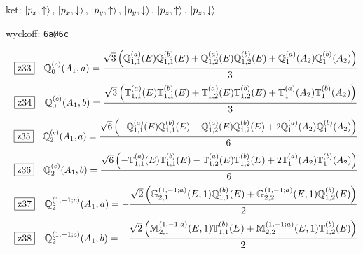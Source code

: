 \documentclass[fleqn,10pt,landscape]{jsarticle}
\begin{document}
\noindent\quad * ket: $\ket{p_{x},\uparrow},\, \ket{p_{x},\downarrow},\, \ket{p_{y},\uparrow},\, \ket{p_{y},\downarrow},\, \ket{p_{z},\uparrow},\, \ket{p_{z},\downarrow}$

\noindent\quad * wyckoff: \texttt{6a@6c}

\begin{dmath*}
\hspace*{3mm}\fbox{z33}\quad \mathbb{Q}_{0}^{(c)}(A_{1},a)=\frac{\sqrt{3} \left(\mathbb{Q}_{1,1}^{(a)}(E) \mathbb{Q}_{1,1}^{(b)}(E) + \mathbb{Q}_{1,2}^{(a)}(E) \mathbb{Q}_{1,2}^{(b)}(E) + \mathbb{Q}_{1}^{(a)}(A_{2}) \mathbb{Q}_{1}^{(b)}(A_{2})\right)}{3}
\end{dmath*}
\begin{dmath*}
\hspace*{3mm}\fbox{z34}\quad \mathbb{Q}_{0}^{(c)}(A_{1},b)=\frac{\sqrt{3} \left(\mathbb{T}_{1,1}^{(a)}(E) \mathbb{T}_{1,1}^{(b)}(E) + \mathbb{T}_{1,2}^{(a)}(E) \mathbb{T}_{1,2}^{(b)}(E) + \mathbb{T}_{1}^{(a)}(A_{2}) \mathbb{T}_{1}^{(b)}(A_{2})\right)}{3}
\end{dmath*}
\begin{dmath*}
\hspace*{3mm}\fbox{z35}\quad \mathbb{Q}_{2}^{(c)}(A_{1},a)=\frac{\sqrt{6} \left(- \mathbb{Q}_{1,1}^{(a)}(E) \mathbb{Q}_{1,1}^{(b)}(E) - \mathbb{Q}_{1,2}^{(a)}(E) \mathbb{Q}_{1,2}^{(b)}(E) + 2 \mathbb{Q}_{1}^{(a)}(A_{2}) \mathbb{Q}_{1}^{(b)}(A_{2})\right)}{6}
\end{dmath*}
\begin{dmath*}
\hspace*{3mm}\fbox{z36}\quad \mathbb{Q}_{2}^{(c)}(A_{1},b)=\frac{\sqrt{6} \left(- \mathbb{T}_{1,1}^{(a)}(E) \mathbb{T}_{1,1}^{(b)}(E) - \mathbb{T}_{1,2}^{(a)}(E) \mathbb{T}_{1,2}^{(b)}(E) + 2 \mathbb{T}_{1}^{(a)}(A_{2}) \mathbb{T}_{1}^{(b)}(A_{2})\right)}{6}
\end{dmath*}
\begin{dmath*}
\hspace*{3mm}\fbox{z37}\quad \mathbb{Q}_{2}^{(1,-1;c)}(A_{1},a)=- \frac{\sqrt{2} \left(\mathbb{G}_{2,1}^{(1,-1;a)}(E,1) \mathbb{Q}_{1,1}^{(b)}(E) + \mathbb{G}_{2,2}^{(1,-1;a)}(E,1) \mathbb{Q}_{1,2}^{(b)}(E)\right)}{2}
\end{dmath*}
\begin{dmath*}
\hspace*{3mm}\fbox{z38}\quad \mathbb{Q}_{2}^{(1,-1;c)}(A_{1},b)=- \frac{\sqrt{2} \left(\mathbb{M}_{2,1}^{(1,-1;a)}(E,1) \mathbb{T}_{1,1}^{(b)}(E) + \mathbb{M}_{2,2}^{(1,-1;a)}(E,1) \mathbb{T}_{1,2}^{(b)}(E)\right)}{2}
\end{dmath*}
\end{document}
